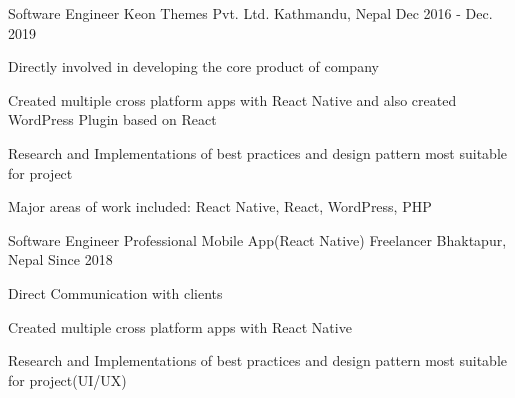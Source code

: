 
\begin{cventries}
  \cventry
    { Software Engineer } %
    {Keon Themes Pvt. Ltd.} %
    {Kathmandu, Nepal} %
    {Dec 2016 - Dec. 2019} %
    {
      \begin{cvitems} %
        \item {Directly involved in developing the core product of company}
        \item {Created multiple cross platform apps with React Native and also created WordPress Plugin based on React }
        \item { Research and Implementations of best practices and design pattern most suitable for project }
        \item {Major areas of work included: React Native, React, WordPress, PHP}
      \end{cvitems}
    }
    
\end{cventries}

\begin{cventries}
  \cventry
    {Software Engineer} %
    {Professional Mobile App(React Native) Freelancer} %
    {Bhaktapur, Nepal} %
    {Since 2018 } %
    {
      \begin{cvitems} %
        \item {Direct Communication with clients}
        \item {Created multiple cross platform apps with React Native}
        \item { Research and Implementations of best practices and design pattern most suitable for project(UI/UX)}
      \end{cvitems}
    }
    
\end{cventries}
